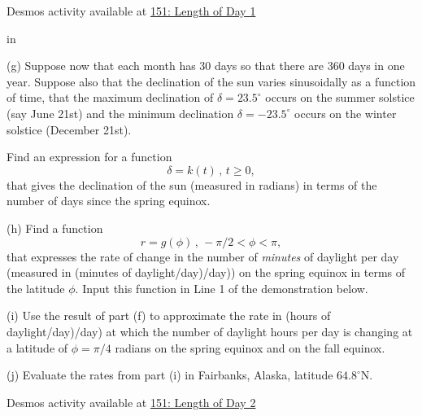\documentclass{ximera}
\newcommand{\pskip}{\vskip 0.1 in}
\begin{document}
\begin{question}
\begin{onlineOnly}
    \begin{center}
\end{center}
\end{onlineOnly}

Desmos activity available at \href{https://www.desmos.com/calculator/ifomatkcta}{151: Length of Day 1}

\pskip 

(g) Suppose now that each month has 30 days so that there are 360 days in one year. Suppose also that the declination of the sun varies sinusoidally as a function of time, that the maximum declination of $\delta = 23.5^\circ$ occurs on the summer solstice (say June 21st) and the minimum declination $\delta = -23.5^\circ$ occurs on the winter solstice (December 21st). 

Find an expression for a function
\[
     \delta = k(t) \, , \, t\geq 0,
\]
that gives the declination of the sun (measured in radians) in terms of the number of days since the spring equinox. 

(h) Find a function
\[
   r = g(\phi) \, , \, -\pi/2 < \phi < \pi ,
\]
that expresses the rate of change in the number of \emph{minutes} of daylight per day (measured in (minutes of daylight/day)/day)) on the spring equinox in terms of the latitude $\phi$. Input this function in Line 1 of the demonstration below.

(i) Use the result of part (f) to approximate the rate in (hours of daylight/day)/day) at which the number of daylight hours per day is changing at a latitude of $\phi = \pi/4$ radians on the spring equinox and on the fall equinox. 

(j) Evaluate the rates from part (i) in Fairbanks, Alaska, latitude $64.8^\circ$N.

\begin{onlineOnly}
    \begin{center}
\end{center}
\end{onlineOnly}

Desmos activity available at \href{https://www.desmos.com/calculator/nf8n5uphhl}{151: Length of Day 2}



\end{question}
\end{document}
